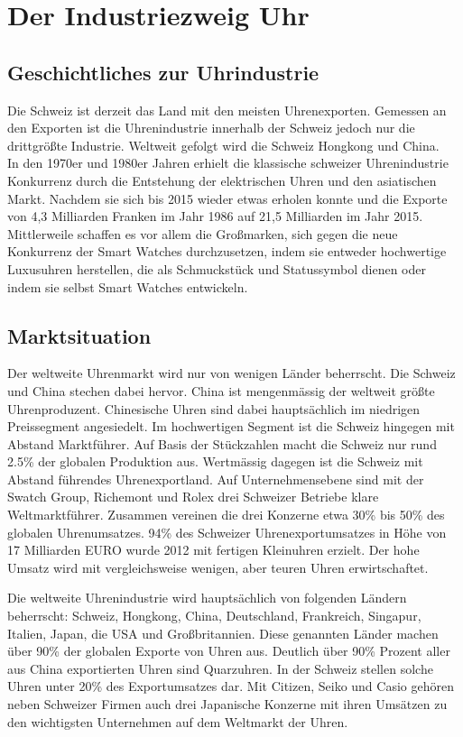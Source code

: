 \clearpage
\chapter{Der Industriezweig Uhr}
\section{Geschichtliches zur Uhrindustrie}
Die Schweiz ist derzeit das Land mit den meisten Uhrenexporten. Gemessen an den Exporten ist die Uhrenindustrie innerhalb der Schweiz jedoch nur die drittgrößte Industrie. Weltweit gefolgt wird die Schweiz Hongkong und China.\\ 
In den 1970er und 1980er Jahren erhielt die klassische schweizer Uhrenindustrie Konkurrenz durch die Entstehung der elektrischen Uhren und den asiatischen Markt. Nachdem sie sich bis 2015 wieder etwas erholen konnte und die Exporte von 4,3 Milliarden Franken im Jahr 1986 auf 21,5 Milliarden im Jahr 2015.\\ 
Mittlerweile schaffen es vor allem die Großmarken, sich gegen die neue Konkurrenz der Smart Watches durchzusetzen, indem sie entweder hochwertige Luxusuhren herstellen, die als Schmuckstück und Statussymbol dienen oder indem sie selbst Smart Watches entwickeln.

\section{Marktsituation}
Der weltweite Uhrenmarkt wird nur von wenigen Länder beherrscht. Die Schweiz und China stechen dabei hervor. China ist mengenmässig der weltweit größte Uhrenproduzent. Chinesische Uhren sind dabei hauptsächlich im niedrigen Preissegment angesiedelt. Im hochwertigen Segment ist die Schweiz hingegen mit Abstand Marktführer. Auf Basis der Stückzahlen macht die Schweiz nur rund 2.5\% der globalen Produktion aus. Wertmässig dagegen ist die Schweiz mit Abstand führendes Uhrenexportland. Auf Unternehmensebene sind mit der Swatch Group, Richemont und Rolex drei Schweizer Betriebe klare Weltmarktführer. Zusammen vereinen die drei Konzerne etwa 30\% bis 50\% des globalen Uhrenumsatzes. 94\% des Schweizer Uhrenexportumsatzes in Höhe von 17 Milliarden EURO wurde 2012 mit fertigen Kleinuhren erzielt. Der hohe Umsatz wird mit vergleichsweise wenigen, aber teuren Uhren erwirtschaftet.

Die weltweite Uhrenindustrie wird hauptsächlich von folgenden Ländern beherrscht: Schweiz, Hongkong, China, Deutschland, Frankreich, Singapur, Italien, Japan, die USA und Großbritannien. Diese genannten Länder machen über 90\% der globalen Exporte von Uhren aus. Deutlich über 90\% Prozent aller aus China exportierten Uhren sind Quarzuhren. In der Schweiz stellen solche Uhren unter 20\% des Exportumsatzes dar. Mit Citizen, Seiko und Casio gehören neben Schweizer Firmen auch drei Japanische Konzerne mit ihren Umsätzen zu den wichtigsten Unternehmen auf dem Weltmarkt der Uhren.

